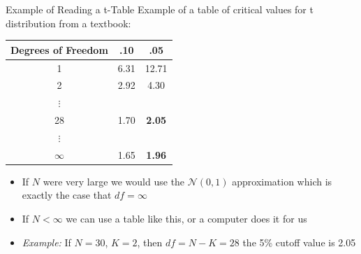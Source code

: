\begin{frame}{Example of Reading a t-Table}
Example of a table of critical values for t distribution from a textbook:
\begin{table}[htp]
\begin{tabular}{ccc}
\hline\hline 
Degrees of Freedom & .10 & .05\\
\hline
1 & 6.31 & 12.71\\
2 & 2.92 & 4.30\\
$\vdots$ & &\\
{\color{red} 28} & 1.70 & {\color{red} \bf 2.05} \\
$\vdots$ & &\\
{\color{red}$\infty$}  & 1.65 & {\color{red} \bf 1.96} \\
\hline
\end{tabular}

\end{table}

\begin{itemize}
	\item If $N$ were very large we would use the $\mathcal{N}(0,1)$ approximation which is exactly the case that $df=\infty$
	\item If $N<\infty$ we can use a table like this, or a computer does it for us
	\item \emph{Example:} If $N=30$, $K=2$, then $df = N-K=28$ the 5\% cutoff value is 2.05 
\end{itemize}

\end{frame}




